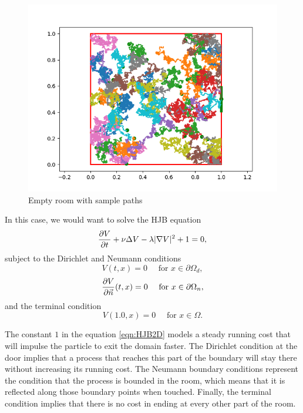 \begin{figure}[H]
	\centering
	\includegraphics[width=0.9\linewidth]{images/pathsInterp.png}
	\caption{Empty room with sample paths}
	\label{fig:EmptyRoom}
\end{figure}

In this case, we would want to solve the HJB equation
\begin{equation}
	\label{eqn:HJB2D}
	\frac{\partial V}{\partial t}+\nu \Delta V -\lambda |\nabla V|^2+1=0,
\end{equation} 
subject to the Dirichlet and Neumann conditions
\begin{equation}
	V(t,x)=0 \quad \text{ for } x\in \partial\Omega_d, 
\end{equation}
\begin{equation}
	\frac{\partial V}{\partial \vec{n}}(t,x)=0 \quad \text{ for } x\in \partial\Omega_n, 
\end{equation}
and the terminal condition
\begin{equation}
	V(1.0,x)=0 \quad \text{ for } x\in \Omega.
\end{equation}

The constant $1$ in the equation \eqref{eqn:HJB2D} models a steady running cost that will impulse the particle to exit the domain faster. The Dirichlet condition at the door implies that a process that reaches this part of the boundary will stay there without increasing its running cost. The Neumann boundary conditions represent the condition that the process is bounded in the room, which means that it is reflected along those boundary points when touched. Finally, the terminal condition implies that there is no cost in ending at every other part of the room. 

